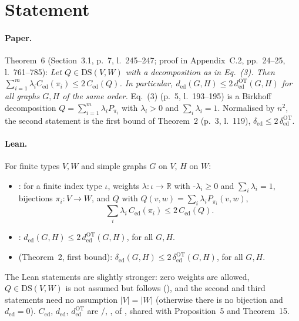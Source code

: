 

\paperversion

\section{Statement}

\paragraph{Paper.} Theorem~6 (Section~3.1, p.~7, l.~245--247; proof in Appendix~C.2, pp.~24--25, l.~761--785):
\emph{Let $Q\in\mathrm{DS}(V,W)$ with a decomposition as in Eq.~(3). Then
$\sum_{i=1}^m\lambda_iC_{\mathrm{ed}}(\pi_i)\le2\,C_{\mathrm{ed}}(Q)$. In particular,
$d_{\mathrm{ed}}(G,H)\le2\,d^{\mathrm{OT}}_{\mathrm{ed}}(G,H)$ for all graphs $G,H$ of the same order.}
Eq.~(3) (p.~5, l.~193--195) is a Birkhoff decomposition $Q=\sum_{i=1}^m\lambda_iP_{\pi_i}$ with $\lambda_i>0$
and $\sum_i\lambda_i=1$. Normalised by $n^2$, the second statement is the first bound of Theorem~2
(p.~3, l.~119), $\delta_{\mathrm{ed}}\le2\,\delta^{\mathrm{OT}}_{\mathrm{ed}}$.

\paragraph{Lean.} For finite types $V,W$ and simple graphs $G$ on $V$, $H$ on $W$:
\begin{itemize}
\item {}: for a finite index type $\iota$, weights $\lambda\colon\iota\to\mathbb R$ with
  \hyp{$\lambda_i\ge0$} and $\sum_i\lambda_i=1$, bijections $\pi_i\colon V\to W$, and $Q$ with
  $Q(v,w)=\sum_i\lambda_iP_{\pi_i}(v,w)$,
  \[ \textstyle\sum_i\lambda_i\,C_{\mathrm{ed}}(\pi_i)\le2\,C_{\mathrm{ed}}(Q). \]
\item {}: $d_{\mathrm{ed}}(G,H)\le2\,d^{\mathrm{OT}}_{\mathrm{ed}}(G,H)$, for all $G,H$.
\item {} (Theorem~2, first bound):
  $\delta_{\mathrm{ed}}(G,H)\le2\,\delta^{\mathrm{OT}}_{\mathrm{ed}}(G,H)$, for all $G,H$.
\end{itemize}
The Lean statements are slightly stronger: zero weights are allowed, $Q\in\mathrm{DS}(V,W)$ is not assumed but
follows (), and the second and third statements need no assumption $|V|=|W|$
(otherwise there is no bijection and $d_{\mathrm{ed}}=0$). $C_{\mathrm{ed}}$, $d_{\mathrm{ed}}$,
$d^{\mathrm{OT}}_{\mathrm{ed}}$ are /, ,  of
, shared with Proposition~5 and Theorem~15.

